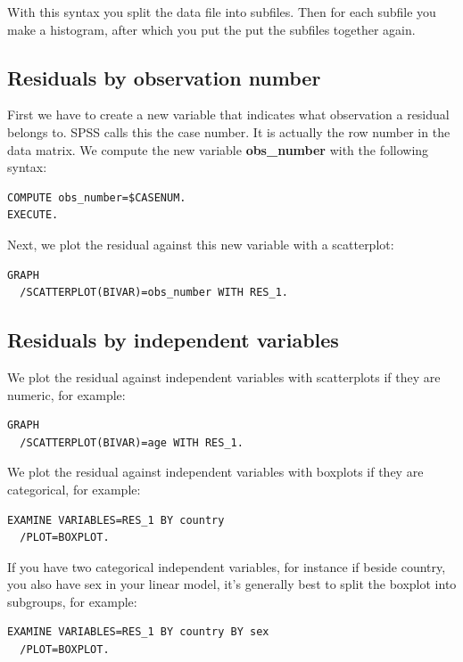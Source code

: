 \documentclass[]{report}\usepackage[]{graphicx}\usepackage[]{color}
\begin{document}
With this syntax you split the data file into subfiles. Then for each subfile you make a histogram, after which you put the put the subfiles together again. 


\subsection{Residuals by observation number}

First we have to create a new variable that indicates what observation a residual belongs to. SPSS calls this the case number. It is actually the row number in the data matrix. We compute the new variable \textbf{obs\_number} with the following syntax:
\begin{verbatim}
COMPUTE obs_number=$CASENUM.
EXECUTE.
\end{verbatim}

Next, we plot the residual against this new variable with a scatterplot:

\begin{verbatim}
GRAPH
  /SCATTERPLOT(BIVAR)=obs_number WITH RES_1.
\end{verbatim}



\subsection{Residuals by independent variables}

We plot the residual against independent variables with scatterplots if they are numeric, for example:

\begin{verbatim}
GRAPH
  /SCATTERPLOT(BIVAR)=age WITH RES_1.
\end{verbatim}


We plot the residual against independent variables with boxplots if they are categorical, for example:

\begin{verbatim}
EXAMINE VARIABLES=RES_1 BY country
  /PLOT=BOXPLOT.
\end{verbatim}

If you have two categorical independent variables, for instance if beside country, you also have sex in your linear model, it's generally best to split the boxplot into subgroups, for example:

\begin{verbatim}
EXAMINE VARIABLES=RES_1 BY country BY sex
  /PLOT=BOXPLOT.
\end{verbatim}
\end{document}
